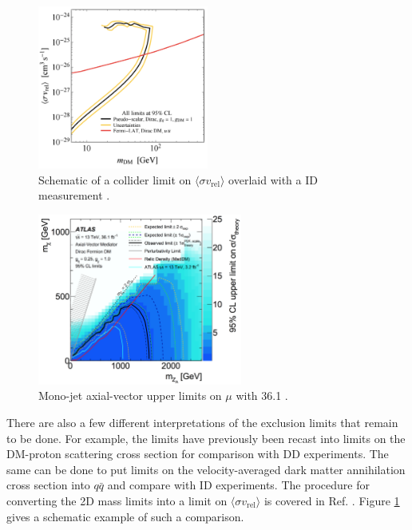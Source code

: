 \begin{figure}[!htb]
\centering
\includegraphics[width=0.5\textwidth]{Figures/id.png}
\caption{Schematic of a collider limit on $\langle \sigma v_\text{rel} \rangle$ overlaid with a ID measurement \cite{Boveia:2016mrp}.}
\label{fig:id}
\end{figure}

\begin{figure}[!htb]
\centering
\includegraphics[width=0.6\textwidth]{Figures/limits_dmA_sigma.png}
\caption{Mono-jet axial-vector upper limits on $\mu$ with 36.1 \ifb \cite{Collaboration:2268179}.}
\label{fig:limits_dmA_sigma_monojet}
\end{figure}

There are also a few different interpretations of the \monoZ exclusion limits that remain to be done. For example, the limits have previously been recast into limits on the DM-proton scattering cross section for comparison with DD experiments. The same can be done to put limits on the velocity-averaged dark matter annihilation cross section into $q\bar{q}$ and compare with ID experiments. The procedure for converting the 2D mass limits into a limit on $\langle \sigma v_\text{rel} \rangle$ is covered in Ref. \cite{Boveia:2016mrp}. Figure \ref{fig:id} gives a schematic example of such a comparison.

